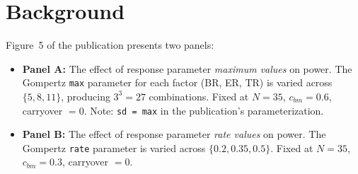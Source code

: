 \documentclass[11pt]{article}
\begin{document}
\maketitle
\thispagestyle{fancy}

\begin{abstract}
Figure~5 of Hendrickson et al.\ (2020) explores how the
response trajectory parameters (Gompertz maximum and rate
for each of three factors) affect statistical power to
detect a biomarker--treatment interaction across four trial
designs. This paper reproduces Figure~5 using both the
original publication code and the revised code, comparing
the results to assess how the methodological corrections
(AR(1) autocorrelation, exponential correlation decay,
\texttt{nlme::lme} with \texttt{corCAR1}) affect the
sensitivity of power to response parameter choices. Both
simulations use 200 replicates per cell.
\end{abstract}

\bigskip
\noindent{}
\bigskip

\tableofcontents
\newpage

\section{Background}

Figure~5 of the publication presents two panels:

\begin{itemize}
\item \textbf{Panel A:} The effect of response parameter
  \emph{maximum values} on power. The Gompertz \texttt{max}
  parameter for each factor (BR, ER, TR) is varied across
  $\{5, 8, 11\}$, producing $3^3 = 27$ combinations.
  Fixed at $N = 35$, $c_{bm} = 0.6$, carryover $= 0$.
  Note: \texttt{sd = max} in the publication's
  parameterization.

\item \textbf{Panel B:} The effect of response parameter
  \emph{rate values} on power. The Gompertz \texttt{rate}
  parameter is varied across $\{0.2, 0.35, 0.5\}$.
  Fixed at $N = 35$, $c_{bm} = 0.3$, carryover $= 0$.
\end{itemize}
\end{document}
